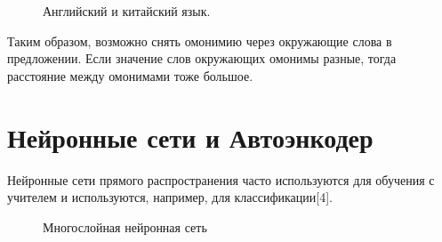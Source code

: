 \documentclass[12pt]{article}
\begin{document}
 	\begin{figure}[H]
		\noindent{}
		\caption{Английский и китайский язык.}
		\label{figCurves}
	\end{figure}

	

Таким образом, возможно снять омонимию через окружающие слова в предложении. Если значение слов окружающих омонимы разные, тогда расстояние между омонимами тоже большое.

\section{Нейронные сети и Автоэнкодер}

Нейронные сети прямого распространения часто используются для обучения с учителем и используются, например, для классификации[4].

  \begin{figure}[H]
    \noindent{}
    \caption{Многослойная нейронная сеть}
    \label{figCurves}
  \end{figure}
\end{document}
